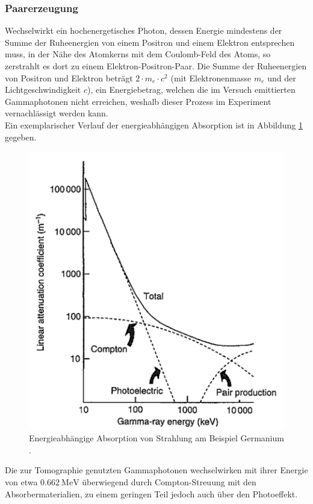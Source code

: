 \subsubsection{Paarerzeugung}
\noindent Wechselwirkt ein hochenergetisches Photon, dessen Energie mindestens der
Summe der Ruheenergien von einem Positron und einem Elektron entsprechen muss,
in der Nähe des Atomkerns mit dem Coulomb-Feld des Atoms, so zerstrahlt es dort
zu einem Elektron-Positron-Paar. Die Summe der Ruheenergien von Positron und
Elektron beträgt $2 \cdot m_e \cdot c^2$ (mit Elektronenmasse $m_e$ und der
Lichtgeschwindigkeit $c$), ein Energiebetrag, welchen die im Versuch emittierten
Gammaphotonen nicht erreichen, weshalb dieser Prozess im Experiment
vernachlässigt werden kann. \\
\newline
\noindent Ein exemplarischer Verlauf der energieabhängigen Absorption ist in
Abbildung \ref{fig:02} gegeben.
\FloatBarrier
\begin{figure}
  \centering
  \includegraphics[scale=0.5]{ressources/abschirmung.png}
  \caption{Energieabhängige Absorption von Strahlung am Beispiel Germanium
           \cite{gil}.}
  \label{fig:02}
\end{figure}
\FloatBarrier
\noindent Die zur Tomographie genutzten Gammaphotonen wechselwirken mit ihrer
Energie von etwa  $\SI{0.662}{\mega\electronvolt}$ überwiegend durch
Compton-Streuung mit den Absorbermaterialien, zu einem geringen Teil jedoch auch
über den Photoeffekt.
